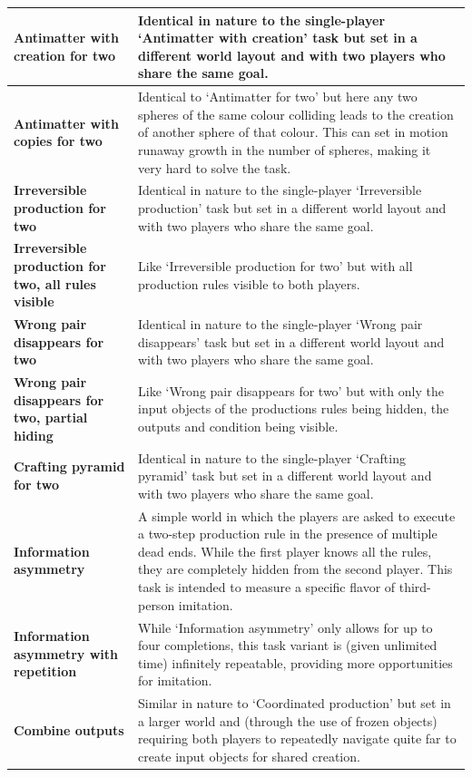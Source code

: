 \documentclass[11pt, a4paper, logo, copyright]{deepmind}
\begin{document}
\begin{appendix}
\begin{longtable}{|>{\raggedright}p{4cm}|p{12cm}|}
\textbf{Antimatter with creation for two} & Identical in nature to the single-player `Antimatter with creation' task but set in a different world layout and with two players who share the same goal. \\ \hline
\textbf{Antimatter with copies for two} & Identical to `Antimatter for two' but here any two spheres of the same colour colliding leads to the creation of another sphere of that colour. This can set in motion runaway growth in the number of spheres, making it very hard to solve the task. \\ \hline
\textbf{Irreversible production for two} & Identical in nature to the single-player `Irreversible production' task but set in a different world layout and with two players who share the same goal. \\ \hline
\textbf{Irreversible production for two, all rules visible} & Like `Irreversible production for two' but with all production rules visible to both players. \\ \hline
\textbf{Wrong pair disappears for two} & Identical in nature to the single-player `Wrong pair disappears' task but set in a different world layout and with two players who share the same goal. \\ \hline
\textbf{Wrong pair disappears for two, partial hiding} & Like `Wrong pair disappears for two' but with only the input objects of the productions rules being hidden, the outputs and condition being visible. \\ \hline
\textbf{Crafting pyramid for two} & Identical in nature to the single-player `Crafting pyramid' task but set in a different world layout and with two players who share the same goal. \\ \hline
\textbf{Information asymmetry} & A simple world in which the players are asked to execute a two-step production rule in the presence of multiple dead ends. While the first player knows all the rules, they are completely hidden from the second player. This task is intended to measure a specific flavor of third-person imitation. \\ \hline
\textbf{Information asymmetry with repetition} & While `Information asymmetry' only allows for up to four completions, this task variant is (given unlimited time) infinitely repeatable, providing more opportunities for imitation. \\ \hline
\textbf{Combine outputs} & Similar in nature to `Coordinated production' but set in a larger world and (through the use of frozen objects) requiring both players to repeatedly navigate quite far to create input objects for shared creation. \\ \hline

\end{longtable}
\end{appendix}
\end{document}
